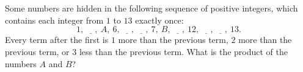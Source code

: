 Some numbers are hidden in the following sequence of positive integers, which contains each integer from $1$ to $13$ exactly once:
\[1,\ \underline{\quad},\ A,\ 6,\ \underline{\quad},\ \underline{\quad},\ 7,\ B,\ \underline{\quad},\ 12,\ \underline{\quad},\ \underline{\quad},\ 13.\]
Every term after the first is $1$ more than the previous term, $2$ more than the previous term, or $3$ less than the previous term. What is the product of the numbers $A$ and $B$?
